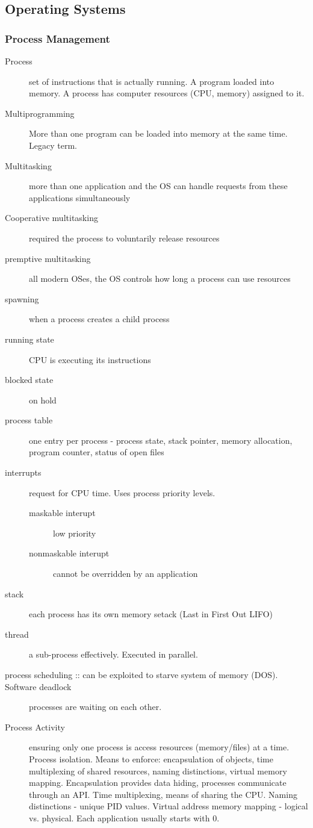 \documentclass[11pt]{article}
\begin{document}
\subsection{Operating Systems}
\label{sec:org5969293}
\subsubsection{Process Management}
\label{sec:org8c85bba}
\begin{description}
\item[{Process}] set of instructions that is actually running. A program loaded into memory. A process has computer resources (CPU, memory) assigned to it.
\item[{Multiprogramming}] More than one program can be loaded into memory at the same time. Legacy term.
\item[{Multitasking}] more than one application and the OS can handle requests from these applications simultaneously
\item[{Cooperative multitasking}] required the process to voluntarily release resources
\item[{premptive multitasking}] all modern OSes, the OS controls how long a process can use resources
\item[{spawning}] when a process creates a child process
\item[{running state}] CPU is executing its instructions
\item[{blocked state}] on hold
\item[{process table}] one entry per process - process state, stack pointer, memory allocation, program counter, status of open files
\item[{interrupts}] request for CPU time. Uses process priority levels.
\begin{description}
\item[{maskable interupt}] low priority
\item[{nonmaskable interupt}] cannot be overridden by an application
\end{description}
\item[{stack}] each process has its own memory setack (Last in First Out LIFO)
\item[{thread}] a sub-process effectively. Executed in parallel.
\item[{process scheduling :: can be exploited to starve system of memory (DOS). Software deadlock}] processes are waiting on each other.
\item[{Process Activity}] ensuring only one process is access resources (memory/files) at a time. Process isolation. Means to enforce: encapsulation of objects, time multiplexing of shared resources, naming distinctions, virtual memory mapping. Encapsulation provides data hiding, processes communicate through an API. Time multiplexing, means of sharing the CPU. Naming distinctions - unique PID values. Virtual address memory mapping - logical vs. physical. Each application usually starts with 0.
\end{description}
\end{document}
